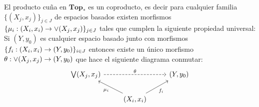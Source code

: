 \documentclass[../../topologia_algebraica]{subfiles}
\begin{document}
\begin{lema}\label{lem:cuna_coproducto}
  El producto cu\~na en $\mathbf{Top}_*$ es un coproducto, es decir para cualquier familia
  $\{(X_j,x_j)\}_{j\in J}$ de espacios basados existen morfismos
  $\{\mu_i:(X_i,x_i)\rightarrow \vee (X_j,x_j)\}_{j\in J}$ tales que cumplen la siguiente propiedad
  universal: Si $(Y,y_0)$ es cualquier espacio basado junto con morfismos
  $\{f_i:(X_i,x_i)\rightarrow (Y,y_0)\}_{i\in J}$ entonces existe un \'unico morfismo
  $\theta:\vee(X_j,x_j)\rightarrow (Y,y_0)$ que hace el siguiente
  diagrama conmutar:
  \begin{equation}\label{cd:cuna_coproducto}
    \begin{tikzcd}
      \bigvee(X_j,x_j) \arrow[rr,dashed,"\theta"] & & (Y,y_0) \\
      & (X_i,x_i) \arrow[ul,"\mu_i"] \arrow[ur,"f_i"'] &
    \end{tikzcd}
  \end{equation}
\end{lema}
\end{document}
